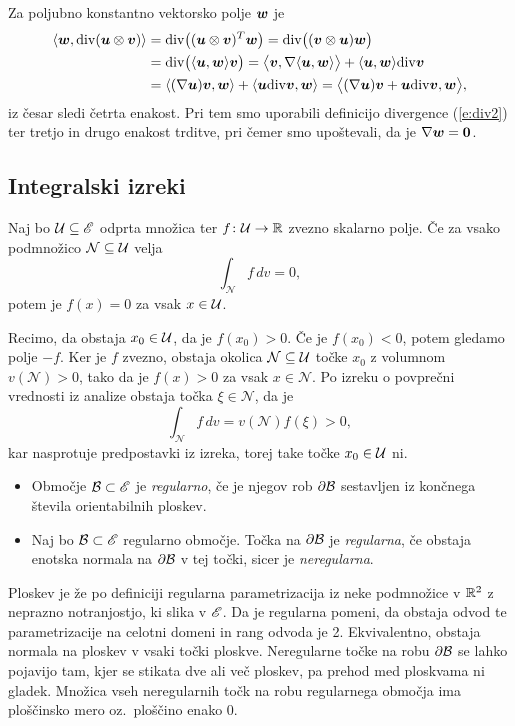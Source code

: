	Za poljubno konstantno vektorsko polje $\boldsymbol w$ je
	\begin{align*}
		\langle\boldsymbol w,\mathrm{div}(\boldsymbol u\otimes\boldsymbol v)\rangle&=\mathrm{div}\big((\boldsymbol u\otimes\boldsymbol v)^T\boldsymbol w\big)=
		\mathrm{div}\big((\boldsymbol v\otimes\boldsymbol u)\boldsymbol w\big)\\
		&=\mathrm{div}\big(\langle\boldsymbol u,\boldsymbol w\rangle\boldsymbol v\big)
		=\big<\boldsymbol v,\nabla\langle\boldsymbol u,\boldsymbol w\rangle\big>+\langle\boldsymbol u,\boldsymbol w\rangle\mathrm{div}\boldsymbol v\\
		&=\langle(\nabla\boldsymbol u)\boldsymbol v,\boldsymbol w\rangle+\langle\boldsymbol u\mathrm{div}\boldsymbol v,\boldsymbol w\rangle
		=\big<(\nabla\boldsymbol u)\boldsymbol v+\boldsymbol u\mathrm{div}\boldsymbol v,\boldsymbol w\big>,
	\end{align*}
	iz česar sledi četrta enakost. Pri tem smo uporabili definicijo divergence (\ref{e:div2}) ter
	tretjo in drugo enakost trditve, pri čemer smo upoštevali, da je $\nabla\boldsymbol w=\mathbf 0$.
\endproof


\subsection{Integralski izreki}


\begin{trditev}\label{t:oiz}
	Naj bo $\mathcal U\subseteq\mathscr E$ odprta množica ter $f\colon \mathcal U\to \mathbb R$ zvezno skalarno polje.
	Če za vsako podmnožico $\mathcal{N}\subseteq \mathcal U$ velja
	\[ \int_{\mathcal{N}} f\,dv=0, \]
	potem je $f(x)=0$ za vsak $x\in \mathcal U$.
\end{trditev}
\proof
	Recimo, da obstaja $x_0\in \mathcal U$, da je $f(x_0)> 0$. Če je $f(x_0)< 0$, potem gledamo polje $-f$.
	Ker je $f$ zvezno, obstaja okolica $\mathcal{N}\subseteq \mathcal U$ točke $x_0$ z volumnom $v(\mathcal{N})>0$, tako da je $f(x)>0$
	za vsak $x\in \mathcal{N}$. Po izreku o povprečni vrednosti iz analize obstaja točka $\xi\in \mathcal{N}$, da je
	\[ \int_{\mathcal{N}}f\,dv=v(\mathcal{N})f(\xi)> 0, \]
	kar nasprotuje predpostavki iz izreka, torej take točke $x_0\in \mathcal U$ ni.
\endproof

\begin{definicija}
	\begin{itemize}
		\item
		Območje $\mathcal B\subset\mathscr E$ je \emph{regularno}, če je njegov rob $\partial \mathcal B$ sestavljen
		iz končnega števila orientabilnih ploskev.
		\item
		Naj bo $\mathcal B\subset\mathscr E$ regularno območje. Točka na $\partial\mathcal B$ je \emph{regularna}, če obstaja enotska normala
		na $\partial\mathcal B$ v tej točki, sicer je \emph{neregularna}.
	\end{itemize}
\end{definicija}
Ploskev je že po definiciji regularna parametrizacija iz neke podmnožice v $\mathbb R^2$ z neprazno notranjostjo,
ki slika v $\mathscr E$. Da je regularna pomeni, da obstaja odvod te parametrizacije na celotni domeni in
rang odvoda je 2. Ekvivalentno, obstaja normala na ploskev v vsaki točki ploskve.
Neregularne točke na robu $\partial\mathcal B$ se lahko pojavijo tam, kjer se stikata dve ali več ploskev,
pa prehod med ploskvama ni gladek.
Množica vseh neregularnih točk na robu regularnega območja ima ploščinsko mero oz.~ploščino enako 0.

